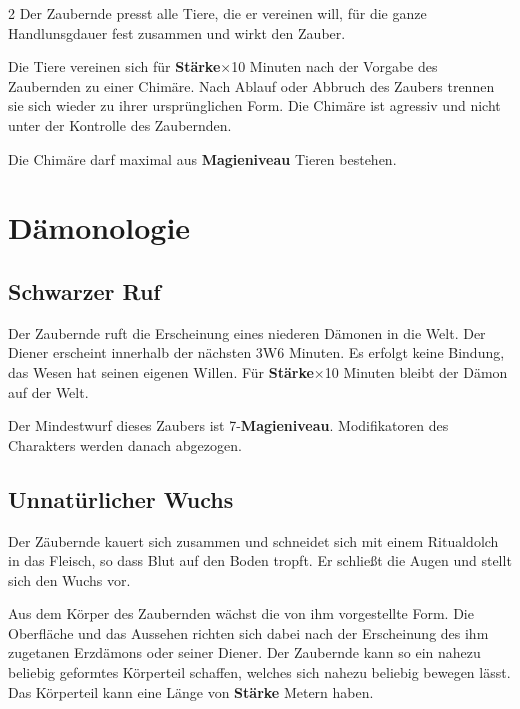 \begin{multicols*}{2}
Der Zaubernde presst alle Tiere, die er vereinen will, für die ganze Handlunsgdauer fest zusammen und wirkt den Zauber.

Die Tiere vereinen sich für \textbf{Stärke}×10 Minuten nach der Vorgabe des Zaubernden zu einer Chimäre. Nach Ablauf oder Abbruch des Zaubers trennen sie sich wieder zu ihrer ursprünglichen Form. Die Chimäre ist agressiv und nicht unter der Kontrolle des Zaubernden.

Die Chimäre darf maximal aus \textbf{Magieniveau} Tieren bestehen.



\section{Dämonologie}

\subsection{Schwarzer Ruf}

Der Zaubernde ruft die Erscheinung eines niederen Dämonen in die Welt. Der Diener erscheint innerhalb der nächsten 3W6 Minuten. Es erfolgt keine Bindung, das Wesen hat seinen eigenen Willen. Für \textbf{Stärke}×10 Minuten bleibt der Dämon auf der Welt.

Der Mindestwurf dieses Zaubers ist 7-\textbf{Magieniveau}. Modifikatoren des Charakters werden danach abgezogen.



\subsection{Unnatürlicher Wuchs}

Der Zäubernde kauert sich zusammen und schneidet sich mit einem Ritualdolch in das Fleisch, so dass Blut auf den Boden tropft. Er schließt die Augen und stellt sich den Wuchs vor.

Aus dem Körper des Zaubernden wächst die von ihm vorgestellte Form. Die Oberfläche und das Aussehen richten sich dabei nach der Erscheinung des ihm zugetanen Erzdämons oder seiner Diener. Der Zaubernde kann so ein nahezu beliebig geformtes Körperteil schaffen, welches sich nahezu beliebig bewegen lässt. Das Körperteil kann eine Länge von \textbf{Stärke} Metern haben.


\end{multicols*}
